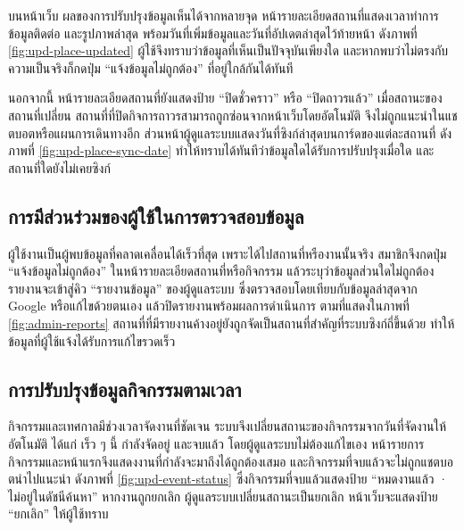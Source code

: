 บนหน้าเว็บ ผลของการปรับปรุงข้อมูลเห็นได้จากหลายจุด หน้ารายละเอียดสถานที่แสดงเวลาทำการ ข้อมูลติดต่อ และรูปภาพล่าสุด พร้อมวันที่เพิ่มข้อมูลและวันที่อัปเดตล่าสุดไว้ท้ายหน้า ดังภาพที่ \ref{fig:upd-place-updated} ผู้ใช้จึงทราบว่าข้อมูลที่เห็นเป็นปัจจุบันเพียงใด และหากพบว่าไม่ตรงกับความเป็นจริงก็กดปุ่ม ``แจ้งข้อมูลไม่ถูกต้อง'' ที่อยู่ใกล้กันได้ทันที


นอกจากนี้ หน้ารายละเอียดสถานที่ยังแสดงป้าย ``ปิดชั่วคราว'' หรือ ``ปิดถาวรแล้ว'' เมื่อสถานะของสถานที่เปลี่ยน สถานที่ที่ปิดกิจการถาวรสามารถถูกซ่อนจากหน้าเว็บโดยอัตโนมัติ จึงไม่ถูกแนะนำในแชตบอตหรือแผนการเดินทางอีก ส่วนหน้าผู้ดูแลระบบแสดงวันที่ซิงก์ล่าสุดบนการ์ดของแต่ละสถานที่ ดังภาพที่ \ref{fig:upd-place-sync-date} ทำให้ทราบได้ทันทีว่าข้อมูลใดได้รับการปรับปรุงเมื่อใด และสถานที่ใดยังไม่เคยซิงก์


\subsection{การมีส่วนร่วมของผู้ใช้ในการตรวจสอบข้อมูล}

ผู้ใช้งานเป็นผู้พบข้อมูลที่คลาดเคลื่อนได้เร็วที่สุด เพราะได้ไปสถานที่หรืองานนั้นจริง สมาชิกจึงกดปุ่ม ``แจ้งข้อมูลไม่ถูกต้อง'' ในหน้ารายละเอียดสถานที่หรือกิจกรรม แล้วระบุว่าข้อมูลส่วนใดไม่ถูกต้อง รายงานจะเข้าสู่คิว ``รายงานข้อมูล'' ของผู้ดูแลระบบ ซึ่งตรวจสอบโดยเทียบกับข้อมูลล่าสุดจาก Google หรือแก้ไขด้วยตนเอง แล้วปิดรายงานพร้อมผลการดำเนินการ ตามที่แสดงในภาพที่ \ref{fig:admin-reports} สถานที่ที่มีรายงานค้างอยู่ยังถูกจัดเป็นสถานที่สำคัญที่ระบบซิงก์ถี่ขึ้นด้วย ทำให้ข้อมูลที่ผู้ใช้แจ้งได้รับการแก้ไขรวดเร็ว

\subsection{การปรับปรุงข้อมูลกิจกรรมตามเวลา}

กิจกรรมและเทศกาลมีช่วงเวลาจัดงานที่ชัดเจน ระบบจึงเปลี่ยนสถานะของกิจกรรมจากวันที่จัดงานให้อัตโนมัติ ได้แก่ เร็ว ๆ นี้ กำลังจัดอยู่ และจบแล้ว โดยผู้ดูแลระบบไม่ต้องแก้ไขเอง หน้ารายการกิจกรรมและหน้าแรกจึงแสดงงานที่กำลังจะมาถึงได้ถูกต้องเสมอ และกิจกรรมที่จบแล้วจะไม่ถูกแชตบอตนำไปแนะนำ ดังภาพที่ \ref{fig:upd-event-status} ซึ่งกิจกรรมที่จบแล้วแสดงป้าย ``หมดงานแล้ว · ไม่อยู่ในดัชนีค้นหา'' หากงานถูกยกเลิก ผู้ดูแลระบบเปลี่ยนสถานะเป็นยกเลิก หน้าเว็บจะแสดงป้าย ``ยกเลิก'' ให้ผู้ใช้ทราบ

